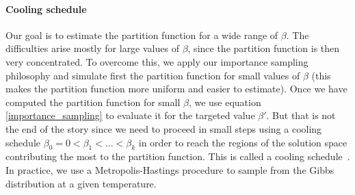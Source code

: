 \paragraph{Cooling schedule}
Our goal is to estimate the partition function for a wide range of $\beta$. The
difficulties arise mostly for large values of $\beta$, since the partition function
is then very concentrated. To overcome this, we apply our importance sampling
philosophy and simulate first the partition function for small values of $\beta$
(this makes the partition function more uniform and easier to estimate). Once we
have computed the partition function for small $\beta$, we use equation
\eqref{importance_sampling} to evaluate it for the targeted value $\beta'$. But
that is not the end of the story since we need to proceed in small steps using a
cooling schedule $\beta_0 = 0 < \beta_1 < \dots < \beta_k$ in order to reach the
regions of the solution space contributing the most to the partition function.
This is called a cooling schedule~\citep{huber2012norm}. In practice, we use a
Metropolis-Hastings procedure to sample from the Gibbs distribution at a given
temperature.

